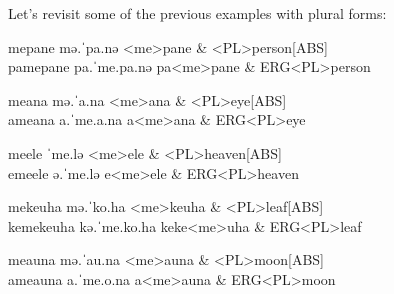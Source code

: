 Let's revisit some of the previous examples with plural forms:

\begin{subexamples}
  \ex
    \preamble mepane
    \pronunciation mə.ˈpa.nə
    \gloss
      <me>pane & <PL>person[ABS] \\
  \ex
    \preamble pamepane
    \pronunciation pa.ˈme.pa.nə
    \gloss
      pa\allo <me>pane & ERG\allo <PL>person \\
\end{subexamples}

\begin{subexamples}
  \ex
    \preamble meana
    \pronunciation mə.ˈa.na
    \gloss
      <me>ana & <PL>eye[ABS] \\
  \ex
    \preamble ameana
    \pronunciation a.ˈme.a.na
    \gloss
      a\allo <me>ana & ERG\allo <PL>eye \\
\end{subexamples}

\begin{subexamples}
  \label{ex:double-schwa}
  \ex
  \preamble meele
  \pronunciation ˈme.lə
  \gloss
    <me>ele & <PL>heaven[ABS] \\
  \ex
    \label{ex:double-schwa-erg}
    \preamble emeele
    \pronunciation ə.ˈme.lə
    \gloss
      e\allo <me>ele & ERG\allo <PL>heaven \\
\end{subexamples}


\begin{subexamples}
  \ex
    \preamble mekeuha
    \pronunciation mə.ˈko.ha
    \gloss
      <me>keuha & <PL>leaf[ABS] \\
  \ex
    \preamble kemekeuha
    \pronunciation kə.ˈme.ko.ha
    \gloss
      ke\allo ke<me>uha & ERG\allo <PL>leaf \\
\end{subexamples}

\begin{subexamples}
  \ex
    \preamble meauna
    \pronunciation mə.ˈau.na
    \gloss
      <me>auna & <PL>moon[ABS] \\
  \ex
    \preamble ameauna
    \pronunciation a.ˈme.o.na
    \gloss
      a\allo <me>auna & ERG\allo <PL>moon \\
    \end{subexamples}


